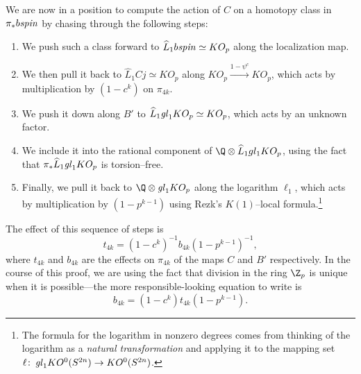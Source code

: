 We are now in a position to compute the action of \(C\) on a homotopy class in \(\pi_* b\mathit{spin}\) by chasing through the following steps:
\begin{enumerate}
    \item We push such a class forward to \(\widehat L_1 b\mathit{spin} \simeq KO_p\) along the localization map.
    \item We then pull it back to \(\widehat L_1 Cj \simeq KO_p\) along \(KO_p \xrightarrow{1 - \psi^c} KO_p\), which acts by multiplication by \((1 - c^k)\) on \(\pi_{4k}\).
    \item We push it down along \(B'\) to \(\widehat L_1 \mathit{gl}_1 KO_p \simeq KO_p\), which acts by an unknown factor.
    \item We include it into the rational component of \(\Q \otimes \widehat L_1 gl_1 KO_p\), using the fact that \(\pi_* \widehat L_1 \mathit{gl}_1 KO_p\) is torsion--free.
    \item Finally, we pull it back to \(\Q \otimes \gl_1 KO_p\) along the logarithm \(\ell_1\), which acts by multiplication by \((1 - p^{k-1})\) using Rezk's \(K(1)\)--local formula.\footnote{The formula for the logarithm in nonzero degrees comes from thinking of the logarithm as a \emph{natural transformation} and applying it to the mapping set \(\ell\colon\thinspace \mathit{gl}_1 KO^0(S^{2n}) \to KO^0(S^{2n})\).}
\end{enumerate}
The effect of this sequence of steps is \[t_{4k} = (1 - c^k)^{-1} b_{4k} (1 - p^{k-1})^{-1},\] where \(t_{4k}\) and \(b_{4k}\) are the effects on \(\pi_{4k}\) of the maps \(C\) and \(B'\) respectively.  In the course of this proof, we are using the fact that division in the ring \(\Z_p\) is unique when it is possible---the more responsible-looking equation to write is \[b_{4k} = (1 - c^k) t_{4k} (1 - p^{k-1}).\]

